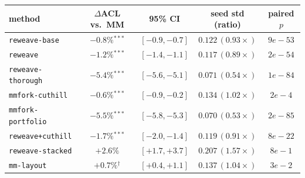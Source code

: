 \begin{tabular}{lcccc}
\toprule
method & $\Delta$ACL vs.\ MM & 95\% CI & seed std (ratio) & paired $p$ \\
\midrule
\texttt{reweave-base} & $-0.8\%$$^{***}$ & $[-0.9,-0.7]$ & $0.122\,(0.93\times)$ & $9e{-}53$ \\
\texttt{reweave} & $-1.2\%$$^{***}$ & $[-1.4,-1.1]$ & $0.117\,(0.89\times)$ & $2e{-}54$ \\
\texttt{reweave-thorough} & $-5.4\%$$^{***}$ & $[-5.6,-5.1]$ & $0.071\,(0.54\times)$ & $1e{-}84$ \\
\texttt{mmfork-cuthill} & $-0.6\%$$^{***}$ & $[-0.9,-0.2]$ & $0.134\,(1.02\times)$ & $2e{-}4$ \\
\texttt{mmfork-portfolio} & $-5.5\%$$^{***}$ & $[-5.8,-5.3]$ & $0.070\,(0.53\times)$ & $2e{-}85$ \\
\texttt{reweave+cuthill} & $-1.7\%$$^{***}$ & $[-2.0,-1.4]$ & $0.119\,(0.91\times)$ & $8e{-}22$ \\
\texttt{reweave-stacked} & $+2.6\%$ & $[+1.7,+3.7]$ & $0.207\,(1.57\times)$ & $8e{-}1$ \\
\texttt{mm-layout} & $+0.7\%$$^{\dagger}$ & $[+0.4,+1.1]$ & $0.137\,(1.04\times)$ & $3e{-}2$ \\
\bottomrule
\end{tabular}
